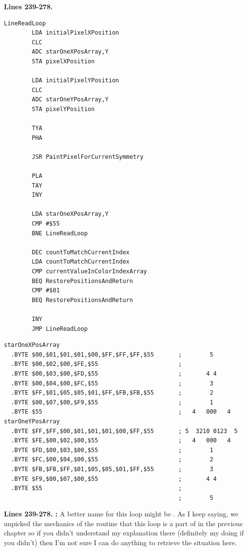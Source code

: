 \clearpage
\textbf{Lines 239-278. }
\begin{lstlisting}[caption=The core pattern-painting loop.]
LineReadLoop   
        LDA initialPixelXPosition
        CLC 
        ADC starOneXPosArray,Y
        STA pixelXPosition

        LDA initialPixelYPosition
        CLC 
        ADC starOneYPosArray,Y
        STA pixelYPosition

        TYA 
        PHA 

        JSR PaintPixelForCurrentSymmetry

        PLA 
        TAY 
        INY 

        LDA starOneXPosArray,Y
        CMP #$55
        BNE LineReadLoop

        DEC countToMatchCurrentIndex
        LDA countToMatchCurrentIndex
        CMP currentValueInColorIndexArray
        BEQ RestorePositionsAndReturn
        CMP #$01
        BEQ RestorePositionsAndReturn

        INY 
        JMP LineReadLoop

\end{lstlisting}
\begin{lstlisting}[basicstyle=\tiny]
starOneXPosArray
  .BYTE $00,$01,$01,$01,$00,$FF,$FF,$FF,$55       ;        5       
  .BYTE $00,$02,$00,$FE,$55                       ;                
  .BYTE $00,$03,$00,$FD,$55                       ;       4 4      
  .BYTE $00,$04,$00,$FC,$55                       ;        3       
  .BYTE $FF,$01,$05,$05,$01,$FF,$FB,$FB,$55       ;        2       
  .BYTE $00,$07,$00,$F9,$55                       ;        1       
  .BYTE $55                                       ;   4   000   4  
starOneYPosArray
  .BYTE $FF,$FF,$00,$01,$01,$01,$00,$FF,$55       ; 5  3210 0123  5
  .BYTE $FE,$00,$02,$00,$55                       ;   4   000   4  
  .BYTE $FD,$00,$03,$00,$55                       ;        1       
  .BYTE $FC,$00,$04,$00,$55                       ;        2       
  .BYTE $FB,$FB,$FF,$01,$05,$05,$01,$FF,$55       ;        3       
  .BYTE $F9,$00,$07,$00,$55                       ;       4 4      
  .BYTE $55                                       ;                
                                                  ;        5       
\end{lstlisting}
\clearpage

\textbf{Lines 239-278. :} A better name for this loop might be . As I keep saying, we unpicked the mechanics
of the  routine that this loop is a part of in the previous chapter so if you didn't understand my explanation there (definitely my doing if you didn't)
then I'm not sure I can do anything to retrieve the situation here.


